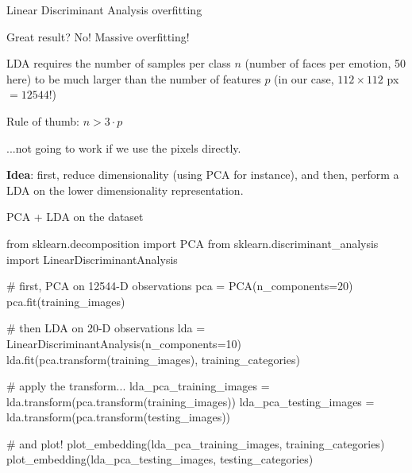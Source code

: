 \documentclass[compress]{beamer}
\begin{document}

\begin{frame}{Linear Discriminant Analysis overfitting}

    \begin{center}
        Great result? No! Massive overfitting!
    \end{center}

    LDA requires the number of samples per class $n$ (\ie number of faces per
    emotion, 50 here) to be much larger than the number of features $p$ (in our case,
    $112\times 112$ px $= 12544$!)

    Rule of thumb: $n > 3\cdot p$

    ...not going to work if we use the pixels directly.
\end{frame}


\begin{frame}{}

    {\bf Idea}: first, reduce dimensionality (using PCA for instance), and then,
    perform a LDA on the lower dimensionality representation.
\end{frame}


\begin{frame}[fragile]{PCA + LDA on the dataset}
    \begin{pythoncode}
from sklearn.decomposition import PCA
from sklearn.discriminant_analysis import LinearDiscriminantAnalysis

# first, PCA on 12544-D observations
pca = PCA(n_components=20)
pca.fit(training_images)

# then LDA on 20-D observations
lda = LinearDiscriminantAnalysis(n_components=10)
lda.fit(pca.transform(training_images), training_categories)

# apply the transform...
lda_pca_training_images = lda.transform(pca.transform(training_images))
lda_pca_testing_images = lda.transform(pca.transform(testing_images))

# and plot!
plot_embedding(lda_pca_training_images, training_categories)
plot_embedding(lda_pca_testing_images, testing_categories)
\end{pythoncode}
\end{frame}


\end{document}
